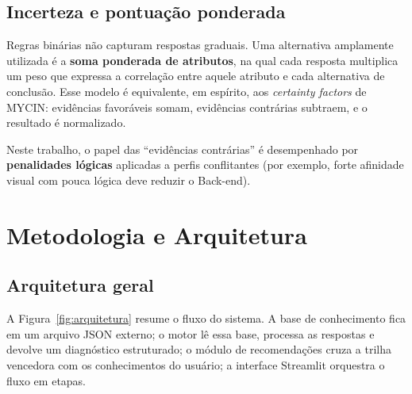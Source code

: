 \documentclass[12pt,a4paper]{article}
\begin{document}
\subsection{Incerteza e pontua\c{c}\~ao ponderada}

Regras bin\'arias n\~ao capturam respostas graduais. Uma alternativa amplamente
utilizada \'e a \textbf{soma ponderada de atributos}, na qual cada resposta
multiplica um peso que expressa a correla\c{c}\~ao entre aquele atributo e cada
alternativa de conclus\~ao. Esse modelo \'e equivalente, em esp\'irito, aos
\textit{certainty factors} de MYCIN: evid\^encias favor\'aveis
somam, evid\^encias contr\'arias subtraem, e o resultado \'e normalizado.

Neste trabalho, o papel das ``evid\^encias contr\'arias'' \'e desempenhado por
\textbf{penalidades l\'ogicas} aplicadas a perfis conflitantes (por exemplo, forte
afinidade visual com pouca l\'ogica deve reduzir o Back-end).

\section{Metodologia e Arquitetura}

\subsection{Arquitetura geral}

A Figura~\ref{fig:arquitetura} resume o fluxo do sistema. A base de conhecimento
fica em um arquivo JSON externo; o motor l\^e essa base, processa as respostas e
devolve um diagn\'ostico estruturado; o m\'odulo de recomenda\c{c}\~oes cruza a trilha
vencedora com os conhecimentos do usu\'ario; a interface Streamlit orquestra o
fluxo em etapas.
\end{document}
